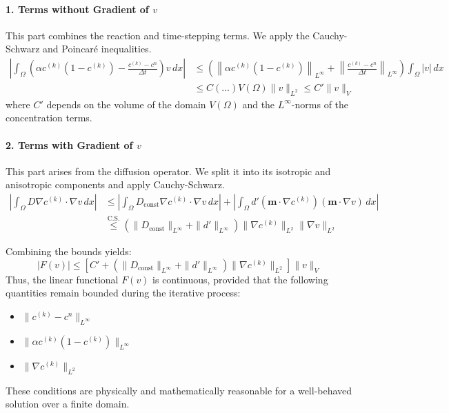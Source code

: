 \documentclass[12pt, a4paper, twoside, openright]{report}
\begin{document}
            \paragraph{1. Terms without Gradient of $v$}
            This part combines the reaction and time-stepping terms. We apply the Cauchy-Schwarz and Poincaré inequalities.
              \begin{align*}
            \left| \int_{\Omega} \left( \alpha c^{(k)}(1-c^{(k)}) - \frac{c^{(k)} - c^n}{\Delta t} \right) v \, dx \right|
              &\leq \left( \left\| \alpha c^{(k)}(1-c^{(k)}) \right\|_{L^\infty} + \left\| \frac{c^{(k)} - c^n}{\Delta t} \right\|_{L^\infty} \right) \int_{\Omega} |v| \, dx \\
              &\leq C \left( \dots \right) V(\Omega) \|v\|_{L^2} \leq C' \|v\|_{V}
            \end{align*}
            where $C'$ depends on the volume of the domain $V(\Omega)$ and the $L^\infty$-norms of the concentration terms.

              \paragraph{2. Terms with Gradient of $v$}
            This part arises from the diffusion operator. We split it into its isotropic and anisotropic components and apply Cauchy-Schwarz.
              \begin{align*}
            \left| \int_{\Omega} D \nabla c^{(k)} \cdot \nabla v \, dx \right| &\leq \left| \int_{\Omega} D_{\text{const}} \nabla c^{(k)} \cdot \nabla v \, dx \right| + \left| \int_{\Omega} d' (\mathbf{m} \cdot \nabla c^{(k)})(\mathbf{m} \cdot \nabla v) \, dx \right| \\
              &\overset{\text{C.S.}}{\leq} \left( \|D_{\text{const}}\|_{L^\infty} + \|d'\|_{L^\infty} \right) \|\nabla c^{(k)}\|_{L^2} \|\nabla v\|_{L^2}
            \end{align*}

            Combining the bounds yields:
              \[
              |F(v)| \leq \left[ C' + \left( \|D_{\text{const}}\|_{L^\infty} + \|d'\|_{L^\infty} \right) \|\nabla c^{(k)}\|_{L^2} \right] \|v\|_{V}
            \]
              Thus, the linear functional $F(v)$ is continuous, provided that the following quantities remain bounded during the iterative process:
              \begin{itemize}
            \item $\|c^{(k)} - c^n\|_{L^\infty}$
              \item $\|\alpha c^{(k)}(1 - c^{(k)})\|_{L^\infty}$
              \item $\|\nabla c^{(k)}\|_{L^2}$
              \end{itemize}
            These conditions are physically and mathematically reasonable for a well-behaved solution over a finite domain.
\end{document}
